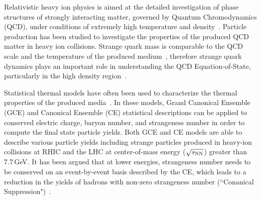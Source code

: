 \documentclass[%
 reprint,	
showpacs,
 amsmath,amssymb,
 aps,
 prc,
]{revtex4-1}
\begin{document}
\maketitle


Relativistic heavy ion physics is aimed at the detailed investigation of phase structures of strongly interacting matter, governed by Quantum Chromodynamics (QCD), under conditions of extremely high temperature and density~\cite{akiba2015hot,StarWhitePaper}. Particle production has been studied to investigate the properties of the produced QCD matter in heavy ion collisions. 
Strange quark mass %
is comparable to the QCD scale 
and
the temperature of the produced medium~\cite{Rafelski:1982pu,Koch:1986ud}, therefore strange quark dynamics plays an important role in understanding the QCD Equation-of-State, particularly in the high density region~\cite{KO_sQM17,Danielewicz1592,Tetyana_ICNN,KO.PhysRevLett.55.2661,HADES.Ks2019457,CASSING.openCharm.2001753}. 

Statistical thermal models have often been used to characterize the thermal properties of the produced media~\cite{BraunMunzinger:2003zd,Redlich_CE}. In these models, Grand Canonical Ensemble (GCE) and Canonical Ensemble (CE) statistical descriptions can be applied to conserved electric charge, baryon number, and strangeness number in order to compute the final state particle yields. Both GCE and CE models are able to describe various particle yields including strange particles produced in heavy-ion collisions at RHIC and the LHC at center-of-mass energy ($\sqrt{s_{\rm NN}}$) greater than 7.7\,GeV. It has been argued that at lower energies, strangeness number needs to be conserved on an event-by-event basis described by the CE, which leads to a reduction in the yields of hadrons with non-zero strangeness number (``Conanical Suppression")~\cite{Redlich:2001kb}.
\end{document}
